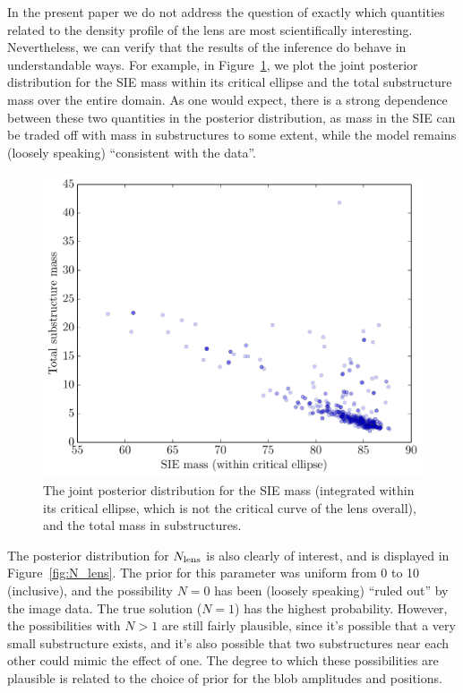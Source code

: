 \documentclass[useAMS,usenatbib]{mn2e}
\begin{document}
In the present paper we do not address the question of exactly which quantities
related to the
density profile of the lens are most scientifically interesting. Nevertheless,
we can verify that the results of the inference do behave in understandable
ways. For example, in Figure~\ref{fig:masses},
we plot the joint posterior distribution
for the SIE mass within its critical ellipse and the total substructure mass
over the entire domain. As one would expect, there is a strong dependence
between these two quantities in the posterior distribution, as mass in the
SIE can be traded off with mass in substructures to some extent, while
the model remains (loosely speaking) ``consistent with the data''.
\begin{figure}
\begin{center}
\includegraphics[scale=0.4]{masses.pdf}
\caption{The joint posterior distribution for the SIE mass (integrated within
its critical ellipse, which is not the critical curve of the lens overall),
and the total mass in substructures.\label{fig:masses}}
\end{center}
\end{figure}

The posterior distribution for $N_{\rm lens}$ is also clearly of interest, and
is displayed in Figure~\ref{fig:N_lens}. The prior for this parameter was
uniform from 0 to 10 (inclusive), and the possibility $N=0$ has been
(loosely speaking) ``ruled out'' by the image data. The true solution ($N=1$)
has the highest probability. However, the possibilities with $N > 1$ are
still fairly plausible, since it's possible that a very small substructure
exists, and it's also possible that two substructures near each other could
mimic the effect of one. The degree to which these possibilities are plausible
is related to the choice of prior for the blob amplitudes and positions.
\end{document}
